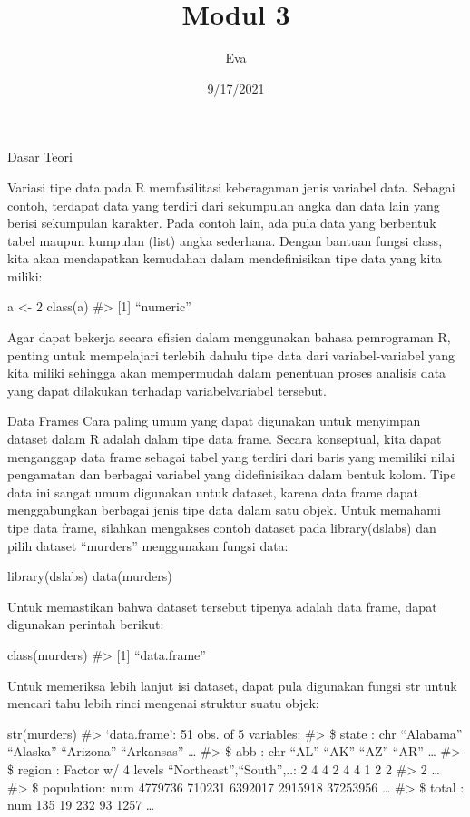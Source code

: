 \documentclass[
]{article}
\title{Modul 3}
\author{Eva}
\date{9/17/2021}
\begin{document}
\maketitle

Dasar Teori

Variasi tipe data pada R memfasilitasi keberagaman jenis variabel data.
Sebagai contoh, terdapat data yang terdiri dari sekumpulan angka dan
data lain yang berisi sekumpulan karakter. Pada contoh lain, ada pula
data yang berbentuk tabel maupun kumpulan (list) angka sederhana. Dengan
bantuan fungsi class, kita akan mendapatkan kemudahan dalam
mendefinisikan tipe data yang kita miliki:

a \textless- 2 class(a) \#\textgreater{} {[}1{]} ``numeric''

Agar dapat bekerja secara efisien dalam menggunakan bahasa pemrograman
R, penting untuk mempelajari terlebih dahulu tipe data dari
variabel-variabel yang kita miliki sehingga akan mempermudah dalam
penentuan proses analisis data yang dapat dilakukan terhadap
variabelvariabel tersebut.

Data Frames Cara paling umum yang dapat digunakan untuk menyimpan
dataset dalam R adalah dalam tipe data frame. Secara konseptual, kita
dapat menganggap data frame sebagai tabel yang terdiri dari baris yang
memiliki nilai pengamatan dan berbagai variabel yang didefinisikan dalam
bentuk kolom. Tipe data ini sangat umum digunakan untuk dataset, karena
data frame dapat menggabungkan berbagai jenis tipe data dalam satu
objek. Untuk memahami tipe data frame, silahkan mengakses contoh dataset
pada library(dslabs) dan pilih dataset ``murders'' menggunakan fungsi
data:

library(dslabs) data(murders)

Untuk memastikan bahwa dataset tersebut tipenya adalah data frame, dapat
digunakan perintah berikut:

class(murders) \#\textgreater{} {[}1{]} ``data.frame''

Untuk memeriksa lebih lanjut isi dataset, dapat pula digunakan fungsi
str untuk mencari tahu lebih rinci mengenai struktur suatu objek:

str(murders) \#\textgreater{} `data.frame': 51 obs. of 5 variables:
\#\textgreater{} \$ state : chr ``Alabama'' ``Alaska'' ``Arizona''
``Arkansas'' \ldots{} \#\textgreater{} \$ abb : chr ``AL'' ``AK'' ``AZ''
``AR'' \ldots{} \#\textgreater{} \$ region : Factor w/ 4 levels
``Northeast'',``South'',..: 2 4 4 2 4 4 1 2 2 \#\textgreater{} 2
\ldots{} \#\textgreater{} \$ population: num 4779736 710231 6392017
2915918 37253956 \ldots{} \#\textgreater{} \$ total : num 135 19 232 93
1257 \ldots{}
\end{document}
